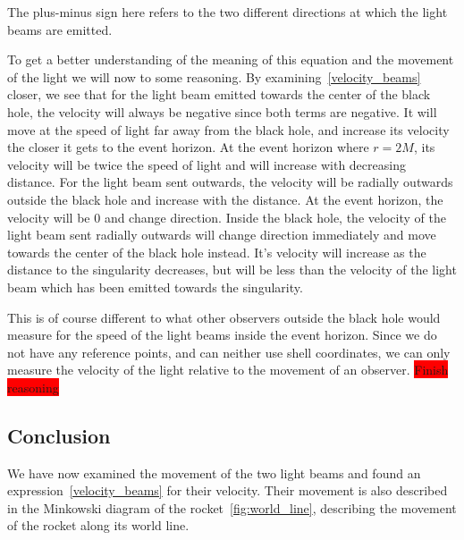 \documentclass[reprint,english,notitlepage]{revtex4-2}
\begin{document}
        The plus-minus sign here refers to the two different directions at which the light beams are emitted.

        To get a better understanding of the meaning of this equation and the movement of the light we will now to some reasoning.
        By examining~\eqref{velocity_beams} closer, we see that for the light beam emitted towards the center of the black hole, the velocity will always be negative since both terms are negative.
        It will move at the speed of light far away from the black hole, and increase its velocity the closer it gets to the event horizon.
        At the event horizon where $r = 2M$, its velocity will be twice the speed of light and will increase with decreasing distance.
        For the light beam sent outwards, the velocity will be radially outwards outside the black hole and increase with the distance.
        At the event horizon, the velocity will be 0 and change direction.
        Inside the black hole, the velocity of the light beam sent radially outwards will change direction immediately and move towards the center of the black hole instead.
        It's velocity will increase as the distance to the singularity decreases, but will be less than the velocity of the light beam which has been emitted towards the singularity.

        This is of course different to what other observers outside the black hole would measure for the speed of the light beams inside the event horizon.
        Since we do not have any reference points, and can neither use shell coordinates, we can only measure the velocity of the light relative to the movement of an observer.
        \colorbox{red}{Finish reasoning}


    \subsection{Conclusion}\label{subsec:conclusion7}
        We have now examined the movement of the two light beams and found an expression~\eqref{velocity_beams} for their velocity.
        Their movement is also described in the Minkowski diagram of the rocket~\ref{fig:world_line}, describing the movement of the rocket along its world line.
\end{document}
